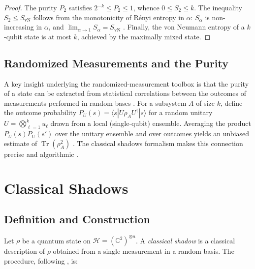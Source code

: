 \documentclass[12pt,a4paper,oneside]{book}
\theoremstyle{plain}
\theoremstyle{definition}
\theoremstyle{remark}
\begin{document}
\begin{proof}
The purity $P_2$ satisfies $2^{-k} \leq P_2 \leq 1$, whence $0 \leq S_2 \leq k$. The inequality $S_2 \leq S_{\text{vN}}$ follows from the monotonicity of R\'enyi entropy in $\alpha$: $S_\alpha$ is non-increasing in $\alpha$, and $\lim_{\alpha \to 1} S_\alpha = S_{\text{vN}}$ \cite{renyi1961entropy}. Finally, the von Neumann entropy of a $k$-qubit state is at most $k$, achieved by the maximally mixed state.
\end{proof}

\subsection{Randomized Measurements and the Purity}

A key insight underlying the randomized-measurement toolbox \cite{elben2023toolbox} is that the purity of a state can be extracted from statistical correlations between the outcomes of measurements performed in random bases \cite{vanenk2012measuring, vermersch2018statistical}. For a subsystem $A$ of size $k$, define the outcome probability $P_U(s) = \langle s| U \rho_A U^\dagger |s \rangle$ for a random unitary $U = \bigotimes_{\ell=1}^{k} u_\ell$ drawn from a local (single-qubit) ensemble. Averaging the product $P_U(s) P_U(s')$ over the unitary ensemble and over outcomes yields an unbiased estimate of $\operatorname{Tr}(\rho_A^2)$ \cite{brydges2019probing}. The classical shadows formalism makes this connection precise and algorithmic \cite{huang2020predicting}.

\section{Classical Shadows}
\label{sec:shadows}

\subsection{Definition and Construction}

Let $\rho$ be a quantum state on $\mathcal{H} = (\mathbb{C}^2)^{\otimes n}$. A \emph{classical shadow} is a classical description of $\rho$ obtained from a single measurement in a random basis. The procedure, following \cite{huang2020predicting}, is:
\end{document}
